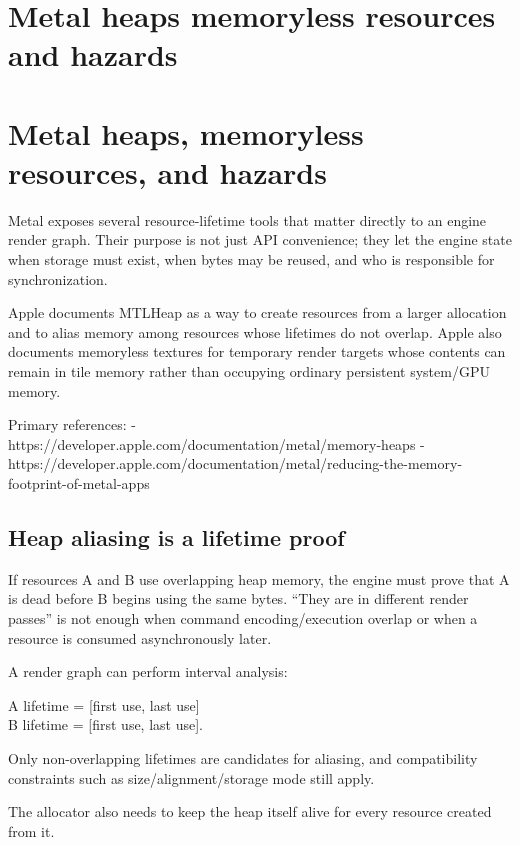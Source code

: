 \hypertarget{appendix-563b2cb23fc3}{}
\section*{Metal heaps memoryless resources and hazards}
\section{Metal heaps, memoryless resources, and hazards}\label{metal-heaps-memoryless-resources-and-hazards}

Metal exposes several resource-lifetime tools that matter directly to an engine render graph. Their purpose is not just API convenience; they let the engine state when storage must exist, when bytes may be reused, and who is responsible for synchronization.

Apple documents MTLHeap as a way to create resources from a larger allocation and to alias memory among resources whose lifetimes do not overlap. Apple also documents memoryless textures for temporary render targets whose contents can remain in tile memory rather than occupying ordinary persistent system/GPU memory.

Primary references: - https://developer.apple.com/documentation/metal/memory-heaps - https://developer.apple.com/documentation/metal/reducing-the-memory-footprint-of-metal-apps

\subsection{Heap aliasing is a lifetime proof}\label{heap-aliasing-is-a-lifetime-proof}

If resources A and B use overlapping heap memory, the engine must prove that A is dead before B begins using the same bytes. ``They are in different render passes'' is not enough when command encoding/execution overlap or when a resource is consumed asynchronously later.

A render graph can perform interval analysis:

A lifetime = {[}first use, last use{]}\\
B lifetime = {[}first use, last use{]}.

Only non-overlapping lifetimes are candidates for aliasing, and compatibility constraints such as size/alignment/storage mode still apply.

The allocator also needs to keep the heap itself alive for every resource created from it.

